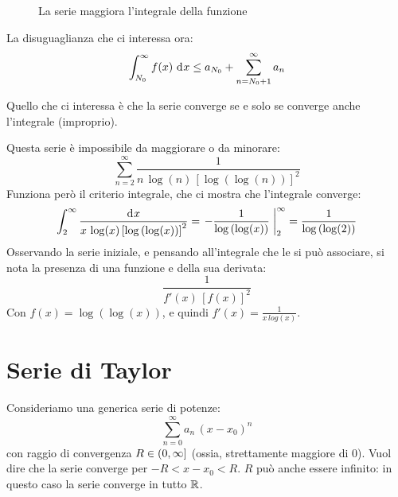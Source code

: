 \begin{figure}[h]
\centering
{}
\caption{\label{fig:serie_maggiora_integrale}La serie maggiora l'integrale della funzione}
\end{figure}

La disuguaglianza che ci interessa ora:
\[
	\int_{N_0}^{\infty} f(x) \dx \le a_{N_0} + \sum_{n = N_0 + 1}^{\infty} a_n 
\]

Quello che ci interessa \`e che la serie converge se e solo se converge anche l'integrale (improprio).

\begin{exmp}
Questa serie \`e impossibile da maggiorare o da minorare:
\[
\sum_{n = 2}^{\infty} \frac{1}{n \, \log (n) \, {\left[ \log \left( \log (n) \right) \right]}^{2}}
\]
Funziona per\`o il criterio integrale, che ci mostra che l'integrale converge:
\[
\int_{2}^{\infty} \frac{\diff x}{x \, \log(x) \, {\left[ \log \left( \log (x) \right) \right]}^{2}} = \increment{- \frac{1}{\log \left( \log(x) \right)}}^{\infty}_{2} = \frac{1}{\log \left( \log(2) \right)}
\]
Osservando la serie iniziale, e pensando all'integrale che le si pu\`o associare, si nota la presenza di una funzione e della sua derivata:
\[
\frac{1}{f'(x) \, {\left[ f(x) \right]}^2}
\]
Con $f(x) = \log \left( \log(x) \right)$, e quindi $f'(x) = \frac{1}{x \, log \left( x \right)}$.
\end{exmp}

\newpage
\section{Serie di Taylor}

Consideriamo una generica serie di potenze:
\[
\sum_{n = 0}^{\infty} a_n \, (x - x_0)^n
\]
con raggio di convergenza $R \in \left( {0}, {\infty} \right]$ (ossia, strettamente maggiore di 0).  Vuol dire che la serie converge per $- R < x - x_0 < R$. $R$ pu\`o anche essere infinito: in questo caso la serie converge in tutto $\mathbb{R}$.

